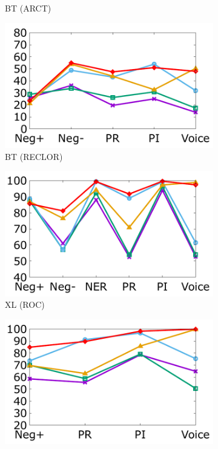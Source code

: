 \begin{figure}[!th]
\begin{subfigure}[b]{0.24\textwidth}
\caption{BT (ARCT)}
\label{fig:arct_bert}
\end{subfigure}
\hfill
\begin{subfigure}[b]{0.24\textwidth}
\centering
\includegraphics[width=\columnwidth]{data/reclor_bert.pdf}
\caption{BT (RECLOR)}
\label{fig:reclor_bert}
\end{subfigure}
\newpage
\begin{subfigure}[b]{0.24\textwidth}
\centering
\includegraphics[width=\columnwidth]{data/roc_xlnet.pdf}
\caption{XL (ROC)}
\label{fig:roc_xlnet}
\end{subfigure}
\hfill
\begin{subfigure}[b]{0.24\textwidth}
\centering
\includegraphics[width=\columnwidth]{data/copa_xlnet.pdf}

\end{subfigure}
\end{figure}
